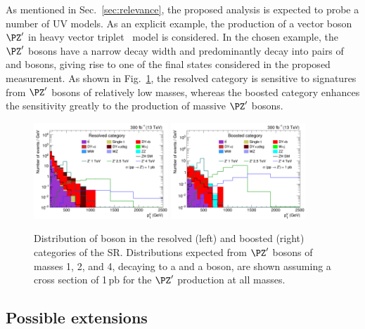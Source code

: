 \documentclass[a4paper,11pt]{article}
\newcommand{\pb} {\mbox{\ensuremath{\,\text{pb}}}\xspace}
\begin{document}
As mentioned in Sec.~\ref{sec:relevance}, the proposed analysis is expected to probe a number of UV models. 
As an explicit example, the production of a vector boson $\PZ^{\prime}$ in heavy vector triplet~\cite{Pappadopulo:2014qza} model is considered.
In the chosen example, the  $\PZ^{\prime}$ bosons have a narrow decay width and predominantly decay into pairs of \PZ and \PH bosons, giving rise to one of the final states considered in the proposed measurement. 
As shown in Fig.~\ref{fig:Zprime}, the resolved category is sensitive to signatures from $\PZ^{\prime}$ bosons of relatively low masses, whereas the boosted category enhances the sensitivity greatly to the production of massive $\PZ^{\prime}$ bosons.
\begin{figure}[t]
\begin{center}
\includegraphics[width=0.45\textwidth]{Figures/RECO/ZH/ZPrime/Plot_Resolved_SR_V_pt.png}
\includegraphics[width=0.45\textwidth]{Figures/RECO/ZH/ZPrime/Plot_Boosted_SR_V_pt.png}
\end{center}
\caption{
Distribution of \PZ boson \pt in the resolved (left) and boosted (right) categories of the SR. Distributions expected from $\PZ^{\prime}$ bosons of masses 1, 2, and 4\TeV, decaying to a \PZ and a \PH boson, are shown assuming a cross section of 1\pb for the $\PZ^{\prime}$ production at all masses. 
}
\label{fig:Zprime}
\end{figure}

\subsection{Possible extensions}
\end{document}
